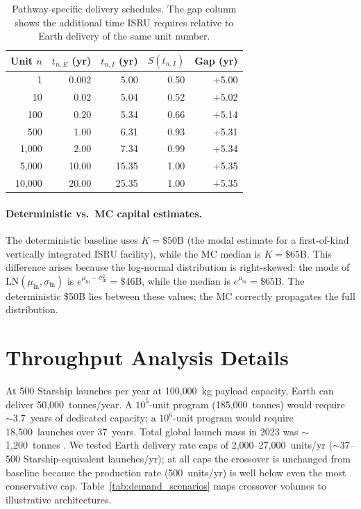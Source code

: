 \documentclass[preprint,12pt]{elsarticle}
\begin{document}
\begin{table}[htbp]
\centering
\caption{Pathway-specific delivery schedules. The gap column shows the additional time ISRU requires relative to Earth delivery of the same unit number.}
\label{tab:production_schedule}
\small
\begin{tabular}{@{}rrrrr@{}}
\toprule
Unit $n$ & $t_{n,E}$ (yr) & $t_{n,I}$ (yr) & $S(t_{n,I})$ & Gap (yr) \\
\midrule
1      & 0.002 & 5.00  & 0.50 & $+$5.00 \\
10     & 0.02  & 5.04  & 0.52 & $+$5.02 \\
100    & 0.20  & 5.34  & 0.66 & $+$5.14 \\
500    & 1.00  & 6.31  & 0.93 & $+$5.31 \\
1{,}000  & 2.00  & 7.34  & 0.99 & $+$5.34 \\
5{,}000  & 10.00 & 15.35 & 1.00 & $+$5.35 \\
10{,}000 & 20.00 & 25.35 & 1.00 & $+$5.35 \\
\bottomrule
\end{tabular}
\end{table}

\paragraph{Deterministic vs.\ MC capital estimates.} The deterministic baseline uses $K = \$50$B (the modal estimate for a first-of-kind vertically integrated ISRU facility), while the MC median is $K = \$65$B. This difference arises because the log-normal distribution is right-skewed: the mode of $\mathrm{LN}(\mu_{\ln}, \sigma_{\ln})$ is $e^{\mu_{\ln} - \sigma_{\ln}^2} = \$46$B, while the median is $e^{\mu_{\ln}} = \$65$B. The deterministic \$50B lies between these values; the MC correctly propagates the full distribution.

\section{Throughput Analysis Details}
\label{sec:appendix_throughput}

At 500 Starship launches per year at 100{,}000~kg payload capacity, Earth can deliver 50{,}000~tonnes/year. A $10^5$-unit program (185{,}000~tonnes) would require $\sim$3.7~years of dedicated capacity; a $10^6$-unit program would require 18{,}500~launches over 37~years. Total global launch mass in 2023 was $\sim$1{,}200~tonnes \cite{jones2022}. We tested Earth delivery rate caps of 2{,}000--27{,}000~units/yr ($\sim$37--500 Starship-equivalent launches/yr); at all caps the crossover is unchanged from baseline because the production rate (500~units/yr) is well below even the most conservative cap. Table~\ref{tab:demand_scenarios} maps crossover volumes to illustrative architectures.
\end{document}
